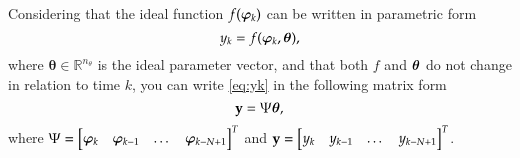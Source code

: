 Considering that the ideal function $f(\bm{\varphi}_{k})$ can be written in parametric form
\begin{equation}
   y_k = f(\bm{\varphi}_{k},\bm{\theta}),
   \label{eq:yk}
\end{equation}
where $\bm{\theta} \in \mathbb{R}^{n_\theta}$ is the ideal parameter vector,
%
and that both $f$ and $\bm{\theta}$ do not change in relation to time $k$, you can write \eqref{eq:yk} in the following matrix form
\begin{equation}
   \label{eq:yMatrix}
   \mathrm{\mathbf{y}} = \Psi\bm{\theta},
\end{equation}
where $\Psi = \begin{bmatrix} \bm{\varphi}_{k} & \bm{\varphi}_{k-1} & \dots & \bm{\varphi}_ {k-N+1} \end{bmatrix}^T$ and $\mathrm{\mathbf{y}} = \begin{bmatrix} y_k & y_{k-1} & \dots & y_{k-N+1} \end{bmatrix}^T$.

